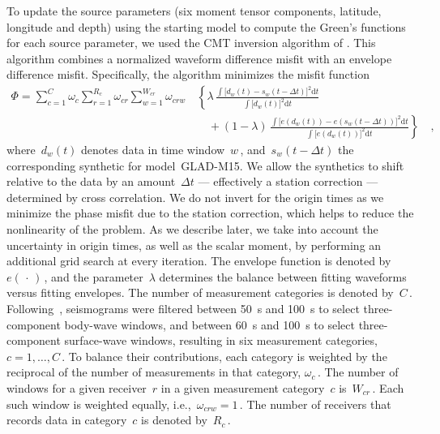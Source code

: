 \documentclass[extra,mreferee]{gji}
\begin{document}
To update the source parameters (six moment tensor components, latitude, longitude and depth) using the starting model to compute the Green's functions for each source parameter,
we used the CMT inversion algorithm of \cite{liu2004spectral}.
This algorithm combines a normalized waveform difference misfit with an envelope difference misfit.
Specifically, the algorithm minimizes the misfit function
\begin{equation}
   \begin{split}
      \Phi =  \sum\limits_{c=1}^{C} \omega_c \sum\limits_{r=1}^{R_c} \omega_{cr}
       \sum\limits_{w=1}^{W_{cr}} \omega_{crw}\,
          & \left\{ \lambda\, \frac
              { \int \big[ d_w(t) - s_w(t - \Delta t) \big]^2 \mathrm{d}t}
              {\int \big[ d_w(t) \big]^2  \mathrm{d}t} \right.
       \\ & \quad \left. \mbox{} + (1 - \lambda)\, \frac
              {\int \big[ e(d_w(t)) - e(s_w(t - \Delta t)) \big]^2 \mathrm{d}t}
              {\int \big[ e(d_w(t)) \big]^2\mathrm{d}t} \right\}
              \quad ,
   \end{split}
\end{equation}
where~$d_w(t)$ denotes data in time window~$w$\,,
and~$s_w(t - \Delta t)$ the corresponding synthetic for model~GLAD-M15.
We allow the synthetics to shift relative to the data by an amount~$\Delta t$
--- effectively a station correction --- determined by cross correlation. We do not invert for the origin times as we minimize the phase misfit due to the station correction, which helps to reduce the nonlinearity of the problem. As we describe later, we take into account the uncertainty in origin times, as well as the scalar moment, by performing an additional grid search at every iteration.
The envelope function is denoted by~$e(\,\cdot\,)$\,,
and the parameter~$\lambda$ determines the balance between fitting waveforms versus fitting envelopes.
The number of measurement categories is denoted by~$C$\,.
Following~\cite{ekstrom2012global},
seismograms were filtered between 50~s and 100~s
to select three-component body-wave windows,
and between 60~s and 100~s to select three-component
surface-wave windows,
resulting in six measurement categories, $c=1,\ldots,C$\,.
To balance their contributions,
each category is weighted by the reciprocal of the number of measurements in that
category, $\omega_c$\,.
The number of windows for a given receiver~$r$ in a given measurement category~$c$ is~$W_{cr}$\,.
Each such window is weighted equally, i.e.,~$\omega_{crw}=1$\,.
The number of receivers that records data in category~$c$ is denoted by~$R_c$\,.
\end{document}
